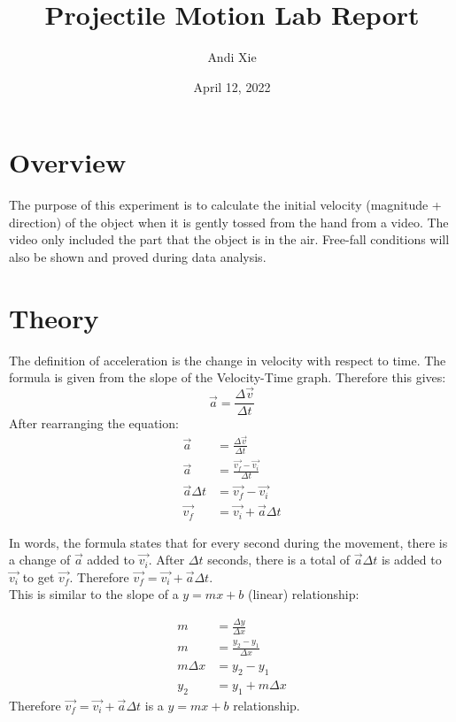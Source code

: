 \documentclass{article}
\title{Projectile Motion Lab Report}
\author{Andi Xie}
\date{April 12, 2022}
\begin{document}
\maketitle
\tableofcontents
\newpage

\section{Overview}
\setcounter{page}{1}
The purpose of this experiment is to calculate the initial velocity (magnitude + direction) of the object when it is gently tossed from the hand from a video. The video only included the part that the object is in the air. Free-fall conditions will also be shown and proved during data analysis.

\section{Theory}
\label{theory}
The definition of acceleration is the change in velocity with respect to time. The formula is given from the slope of the Velocity-Time graph. Therefore this gives:
$$\Vec{a}=\frac{\Delta \Vec{v}}{\Delta t}$$
After rearranging the equation:
\begin{align*}
\Vec{a}&=\frac{\Delta \Vec{v}}{\Delta t}\\
  \Vec{a}&=\frac{\Vec{v_f}-\Vec{v_i}}{\Delta t}\\
  \Vec{a}\Delta t&=\Vec{v_f}-\Vec{v_i}\\
  \Vec{v_f}&=\Vec{v_i}+\Vec{a}\Delta t
\end{align*}

In words, the formula states that for every second during the movement, there is a change of $\Vec{a}$ added to $\Vec{v_i}$. After $\Delta t$ seconds, there is a total of $\Vec{a}\Delta t$ is added to $\Vec{v_i}$ to get $\Vec{v_f}$. Therefore $\Vec{v_f}=\Vec{v_i}+\Vec{a}\Delta t$.\\
This is similar to the slope of a $y=mx+b$ (linear) relationship:

\begin{align*}
    m&=\frac{\Delta y}{\Delta x}\\
    m&=\frac{y_2-y_1}{\Delta x}\\
    m\Delta x&=y_2-y_1\\
    y_2&=y_1+m\Delta x
\end{align*}
Therefore $\Vec{v_f}=\Vec{v_i}+\Vec a\Delta t$ is a $y=mx+b$ relationship.
\end{document}

